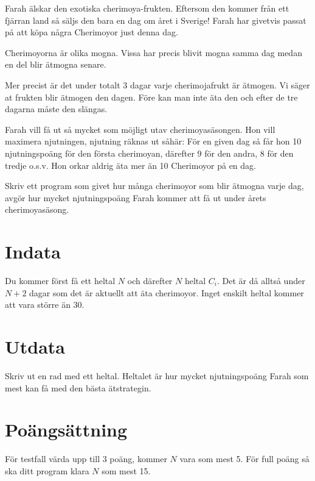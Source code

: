 
Farah älskar den exotiska cherimoya-frukten. Eftersom den kommer från ett
fjärran land så säljs den bara en dag om året i Sverige! Farah har givetvis
passat på att köpa några Cherimoyor just denna dag.

Cherimoyorna är olika mogna. Vissa har precis blivit mogna samma dag medan en
del blir ätmogna senare.

Mer precist är det under totalt 3 dagar varje cherimojafrukt är ätmogen. Vi
säger at frukten blir ätmogen den dagen. Före kan man inte äta den och efter de
tre dagarna måste den slängas.

Farah vill få ut så mycket som möjligt utav cherimoyasäsongen. Hon vill
maximera njutningen, njutning räknas ut såhär: För en given dag så får hon 10
njutningspoäng för den första cherimoyan, därefter 9 för den andra, 8 för den
tredje o.s.v. Hon orkar aldrig äta mer än 10 Cherimoyor på en dag.

Skriv ett program som givet hur många cherimoyor som blir ätmogna varje dag,
avgör hur mycket njutningspoäng Farah kommer att få ut under årets
cherimoyasäsong.

\section*{Indata}

Du kommer först få ett heltal $N$ och därefter $N$ heltal
$C_i$. Det är då alltså under $N+2$ dagar som det är aktuellt att äta cherimoyor.
Inget enskilt heltal kommer att vara större än 30.

\section*{Utdata}

Skriv ut en rad med ett heltal. Heltalet är hur mycket njutningspoäng Farah som
mest kan få med den bästa ätstrategin.

\section*{Poängsättning}

För testfall värda upp till $3$ poäng, kommer $N$ vara som mest 5. För full
poäng så ska ditt program klara $N$ som mest 15.
